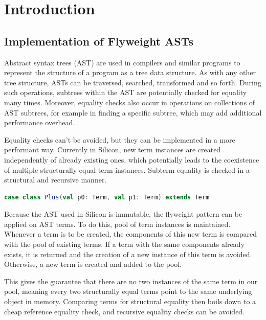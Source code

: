 \documentclass[11pt]{article}
\begin{document}
    \tableofcontents
    \newpage


    \section{Introduction}
    
    \subsection{Implementation of Flyweight ASTs} \label{approach:flyweight}

    Abstract syntax trees (AST) are used in compilers and similar programs to represent
    the structure of a program as a tree data structure. As with any other tree structure,
    ASTs can be traversed, searched, transformed and so forth. During such operations,
    subtrees within the AST are potentially checked for equality many times.  Moreover, equality checks
    also occur in operations on collections of AST subtrees, for example in finding
    a specific subtree, which may add additional performance overhead.

    Equality checks can't be avoided, but they can be implemented in a more performant way.
    Currently in Silicon, new term instances are created independently of already existing ones, which potentially leads 
    to the coexistence of multiple structurally equal term instances. Subterm equality is checked in a
    structural and recursive manner.

\begin{lstlisting}[language=Scala, caption={Simplification of how term instances currently are
    implemented. Because \texttt{Plus} is defined as a case class, the compiler automatically
    generates code for recursive structural equality checking.}]
case class Plus(val p0: Term, val p1: Term) extends Term
\end{lstlisting}
        
    Because the AST used in Silicon is immutable, the flyweight pattern \cite{patterns}
    can be applied on AST terms.
    To do this, pool of term instances is maintained. Whenever a term
    is to be created, the components of this new term is compared with the
    pool of existing terms. If a term with the same components already exists, it is returned and
    the creation of a new instance of this term is avoided. Otherwise, a new term is created and added to
    the pool.

    This gives the guarantee that there are no two instances of the
    same term in our pool, meaning every two structurally equal terms point to the same
    underlying object in memory. Comparing terms for structural equality then boils
    down to a cheap reference equality check, and recursive equality checks can be avoided.
    
\end{document}
